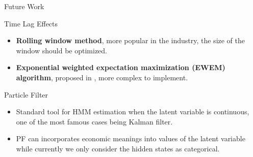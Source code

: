 \begin{frame}[fragile,t]{Future Work}
	\begin{block}{Time Lag Effects}
    \begin{itemize}
    \item \textbf{Rolling window method}, more popular in the industry,
    	the size of the window should be optimized.
    \item \textbf{Exponential weighted expectation maximization (EWEM) algorithm},
    	proposed in \cite{Zhang:2005tp}, more complex to implement.
    \end{itemize}
    \end{block}
    
    \begin{block}{Particle Filter}
    \begin{itemize}
    \item Standard tool for HMM estimation when the latent variable is continuous,
    	one of the most famous cases being Kalman filter.
    \item PF can incorporates economic meanings into values of the latent variable while currently 
    	we only consider the hidden states as categorical.
    \end{itemize}
    \end{block}
\end{frame}